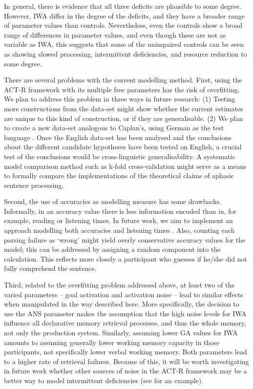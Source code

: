 \documentclass{cambridge7A}\usepackage[]{graphicx}\usepackage[]{color}
\begin{document}
In general, there is evidence that all three deficits are plausible to some degree. However, IWA differ in the degree of the deficits, and they have a broader range of parameter values than controls.
Nevertheless, even the controls show a broad range of differences in parameter values, and even though these are not as variable as IWA, this suggests that some of the unimpaired controls can be seen as showing slowed processing, intermittent deficiencies, and resource reduction to some degree.

There are several problems with the current modelling method. First, using the ACT-R framework with its multiple free parameters has the risk of overfitting. We plan to address this problem in three ways in future research: (1) Testing more constructions from the \cite{CaplanEtAl2015} data-set might show whether the current estimates are unique to this kind of construction, or if they are generalisable. (2) We plan to create a new data-set analogous to Caplan's, using German as the test language \citep{PreglaTR,PreglaBL}. Once the English data-set has been analysed and the conclusions about the different candidate hypotheses have been tested on English, a crucial test of the conclusions would be cross-linguistic generalisability.
A systematic model comparison method such as k-fold cross-validation might 
serve  as a means to formally compare the implementations of the theoretical claims of aphasic sentence processing.

Second, the use of accuracies as modelling measure has some drawbacks. Informally, in an accuracy value there is less information encoded than in, for example, reading or listening times. In future work, we aim to implement an approach modelling both accuracies and listening times \citep{NicenboimRetrieval2018}. Also, counting each parsing failure as `wrong' might yield overly conservative accuracy values for the model; this can be addressed by assigning a random component into the calculation. This reflects more closely a participant who guesses if he/she did not fully comprehend the sentence.

Third, related to the overfitting problem addressed above, at least two of the varied parameters -- goal activation and activation noise -- lead to similar effects when manipulated in the way described here. 
More specifically, the decision to use the ANS parameter makes the assumption that the high noise levels for IWA influence all declarative memory retrieval processes, and thus the whole memory, not only the production system. 
Similarly, assuming lower GA values for IWA amounts to assuming generally lower working memory capacity in those participants, not specifically lower verbal working memory.
Both parameters lead to a higher rate of retrieval failures. Because of this, it will be worth investigating in future work whether other sources of noise in the ACT-R framework may be a better way to model intermittent deficiencies (see \citealp{PatilEtAl2016} for an example).
\end{document}
